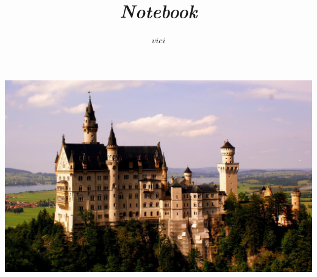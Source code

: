 \documentclass[twocolumn]{article}
\title{\Huge{\textit{\textbf{Notebook}}}}
\author{$vici$}
\begin{document}
\begin{onecolumn}
\maketitle
\centerline{\includegraphics[width=16cm]{photo3.jpg} }
\end{onecolumn}
\end{document}

